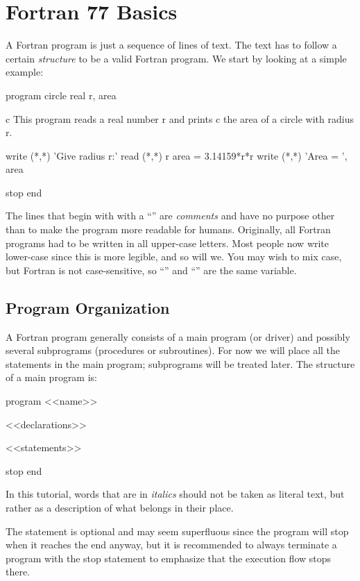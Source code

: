 \section{Fortran 77 Basics}

A Fortran program is just a sequence of lines of text. The text has to
follow a certain \textit{structure} to be a valid Fortran program. We
start by looking at a simple example:

\begin{fortran77}
      program circle
      real r, area

c This program reads a real number r and prints
c the area of a circle with radius r.

      write (*,*) 'Give radius r:'
      read  (*,*) r
      area = 3.14159*r*r
      write (*,*) 'Area = ', area

      stop
      end
\end{fortran77}

The lines that begin with with a ``'' are
\textit{comments} and have no purpose other than to make the program
more readable for humans. Originally, all Fortran programs had to be
written in all upper-case letters. Most people now write lower-case
since this is more legible, and so will we. You may wish to mix case,
but Fortran is not case-sensitive, so ``'' and
``'' are the same variable.


\subsection*{Program Organization}

A Fortran program generally consists of a main program (or driver) and
possibly several subprograms (procedures or subroutines). For now we
will place all the statements in the main program; subprograms will be
treated later. The structure of a main program is:

\begin{fortran77}
      program <<name>>

      <<declarations>>

      <<statements>>

      stop
      end
\end{fortran77}

In this tutorial, words that are in \textit{italics} should not be taken
as literal text, but rather as a description of what belongs in their
place.

The  statement is optional and may seem
superfluous since the program will stop when it reaches the end anyway,
but it is recommended to always terminate a program with the stop
statement to emphasize that the execution flow stops there.

